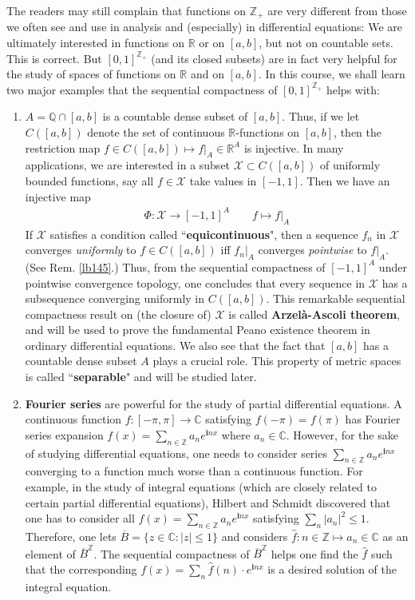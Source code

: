 \documentclass[12pt,b5paper,notitlepage]{article}
\theoremstyle{definition}
\theoremstyle{plain}
\newcommand{\mc}{\mathcal}
\newcommand{\wht}{\widehat}
\newcommand{\ovl}{\overline}
\newcommand{\im}{\mathbf{i}}
\newcommand{\Cbb}{\mathbb C}
\newcommand{\Zbb}{\mathbb Z}
\newcommand{\Qbb}{\mathbb Q}
\newcommand{\Rbb}{\mathbb R}
\numberwithin{equation}{section}
\begin{document}
The readers may still complain that functions on $\Zbb_+$ are very different from those we often see and use in analysis and (especially) in differential equations: We are ultimately interested in functions on $\Rbb$ or on $[a,b]$, but not on countable sets. This is correct. But $[0,1]^{\Zbb_+}$ (and its closed subsets) are in fact very helpful for the study of spaces of functions on $\Rbb$ and on $[a,b]$. In this course, we shall learn two major examples that the sequential compactness of $[0,1]^{\Zbb_+}$ helps with:
\begin{enumerate}
\item $A=\Qbb\cap[a,b]$ is a countable dense subset of $[a,b]$. Thus, if we let $C([a,b])$ denote the set of continuous $\Rbb$-functions on $[a,b]$, then the restriction map $f\in C([a,b])\mapsto f|_A\in\Rbb^A$ is injective. In many applications, we are interested in a subset $\mc X\subset C([a,b])$ of uniformly bounded functions, say all $f\in\mc X$ take values in $[-1,1]$. Then we have an injective map
\begin{align*}
\Phi:\mc X\rightarrow [-1,1]^A\qquad f\mapsto f|_A
\end{align*}
If $\mc X$ satisfies a condition called ``\textbf{equicontinuous}", then  a sequence $f_n$ in $\mc X$ converges \textit{uniformly} to $f\in C([a,b])$ iff $f_n|_A$ converges \textit{pointwise} to $f|_A$. (See Rem. \ref{lb145}.) Thus, from the sequential compactness of $[-1,1]^A$ under pointwise convergence topology, one concludes that every sequence in $\mc X$ has a subsequence converging uniformly in $C([a,b])$. This remarkable sequential compactness result on (the closure of) $\mc X$ is called \textbf{Arzel\`a-Ascoli theorem}, and will be used to prove the fundamental Peano existence theorem in ordinary differential equations. We also see that the fact that $[a,b]$ has a countable dense subset $A$ plays a crucial role. This property of metric spaces is called ``\textbf{separable}" and will be studied later.

\item \textbf{Fourier series} are powerful for the study of partial differential equations. A continuous function $f:[-\pi,\pi]\rightarrow\Cbb$ satisfying $f(-\pi)=f(\pi)$ has Fourier series expansion $f(x)=\sum_{n\in\Zbb}a_n e^{\im nx}$ where $a_n\in\Cbb$. However, for the sake of studying differential equations, one needs to consider series $\sum_{n\in\Zbb}a_n e^{\im nx}$ converging to a function much worse than a continuous function. For example, in the study of integral equations (which are closely related to certain partial differential equations), Hilbert and Schmidt discovered that one has to consider all $f(x)=\sum_{n\in\Zbb}a_n e^{\im nx}$ satisfying $\sum_n |a_n|^2\leq 1$. Therefore, one lets $\ovl B=\{z\in\Cbb:|z|\leq 1\}$ and considers $\wht f:n\in\Zbb\mapsto a_n\in\Cbb$ as an element of $\ovl B^\Zbb$. The sequential compactness of $\ovl B^\Zbb$ helps one find the $\wht f$ such that the corresponding $f(x)=\sum_n \wht f(n)\cdot e^{\im nx}$ is a desired solution of the integral equation. 
\end{enumerate}
\end{document}
